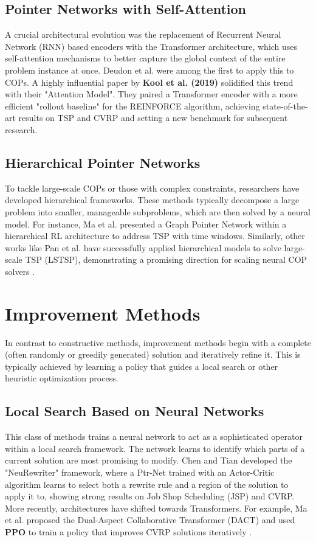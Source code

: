 \subsection{Pointer Networks with Self-Attention}
A crucial architectural evolution was the replacement of Recurrent Neural Network (RNN) based encoders with the Transformer architecture, which uses self-attention mechanisms to better capture the global context of the entire problem instance at once. Deudon et al. were among the first to apply this to COPs. A highly influential paper by \textbf{Kool et al. (2019)} \cite{koolAttentionLearnSolve2019a} solidified this trend with their "Attention Model". They paired a Transformer encoder with a more efficient "rollout baseline" for the REINFORCE algorithm, achieving state-of-the-art results on TSP and CVRP and setting a new benchmark for subsequent research.

\subsection{Hierarchical Pointer Networks}
To tackle large-scale COPs or those with complex constraints, researchers have developed hierarchical frameworks. These methods typically decompose a large problem into smaller, manageable subproblems, which are then solved by a neural model. For instance, Ma et al. presented a Graph Pointer Network within a hierarchical RL architecture to address TSP with time windows. Similarly, other works like Pan et al. have successfully applied hierarchical models to solve large-scale TSP (LSTSP), demonstrating a promising direction for scaling neural COP solvers \cite{wangSolvingCombinatorialOptimization2024}.

\section{Improvement Methods}
In contrast to constructive methods, improvement methods begin with a complete (often randomly or greedily generated) solution and iteratively refine it. This is typically achieved by learning a policy that guides a local search or other heuristic optimization process.

\subsection{Local Search Based on Neural Networks}
This class of methods trains a neural network to act as a sophisticated operator within a local search framework. The network learns to identify which parts of a current solution are most promising to modify. Chen and Tian developed the "NeuRewriter" framework, where a Ptr-Net trained with an Actor-Critic algorithm learns to select both a rewrite rule and a region of the solution to apply it to, showing strong results on Job Shop Scheduling (JSP) and CVRP. More recently, architectures have shifted towards Transformers. For example, Ma et al. proposed the Dual-Aspect Collaborative Transformer (DACT) and used \textbf{PPO} to train a policy that improves CVRP solutions iteratively \cite{wangSolvingCombinatorialOptimization2024}.


